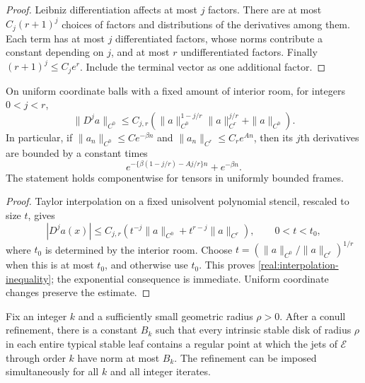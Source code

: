 \begin{proof}
Leibniz differentiation affects at most $j$ factors. There are at
most $C_j(r+1)^j$ choices of factors and distributions of the
derivatives among them. Each term has at most $j$ differentiated
factors, whose norms contribute a constant depending on $j$, and at
most $r$ undifferentiated factors. Finally
$(r+1)^j\le C_j e^r$. Include the terminal vector as one additional
factor.
\end{proof}

\begin{lemma}\label{real:interpolation}
On uniform coordinate balls with a fixed amount of interior room,
for integers $0<j<r$,
\begin{equation}\label{real:interpolation-inequality}
 \|D^j a\|_{C^0}
 \le C_{j,r}\left(
   \|a\|_{C^0}^{1-j/r}\|a\|_{C^r}^{j/r}
     +\|a\|_{C^0}\right).
\end{equation}
In particular, if
$\|a_n\|_{C^0}\le C e^{-\beta n}$ and
$\|a_n\|_{C^r}\le C_r e^{A n}$, then its $j$th derivatives
are bounded by a constant times
\[
 e^{-\{\beta(1-j/r)-Aj/r\}n}+e^{-\beta n}.
\]
The statement holds componentwise for tensors in uniformly bounded
frames.
\end{lemma}

\begin{proof}
Taylor interpolation on a fixed unisolvent polynomial stencil,
rescaled to size $t$, gives
\[
 |D^j a(x)|\le C_{j,r}
    \left(t^{-j}\|a\|_{C^0}
           +t^{r-j}\|a\|_{C^r}\right),
 \qquad 0<t<t_0,
\]
where $t_0$ is determined by the interior room. Choose
$t=(\|a\|_{C^0}/\|a\|_{C^r})^{1/r}$ when this is at most
$t_0$, and otherwise use $t_0$. This proves
\eqref{real:interpolation-inequality}; the exponential consequence
is immediate. Uniform coordinate changes preserve the estimate.
\end{proof}

\begin{lemma}\label{real:good-points}
Fix an integer $k$ and a sufficiently small geometric radius
$\rho>0$. After a conull refinement, there is a constant $B_k$
such that every intrinsic stable disk of radius $\rho$ in each
entire typical stable leaf contains a regular point at which the
jets of $\mathcal E$ through order $k$ have norm at most $B_k$.
The refinement can be imposed simultaneously for all $k$ and all
integer iterates.
\end{lemma}

